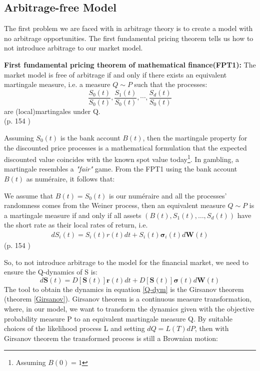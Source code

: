 \subsection{Arbitrage-free Model}
The first problem we are faced with in arbitrage theory is to create a model with no arbitrage opportunities. The first fundamental pricing theorem tells us how to not introduce arbitrage to our market model.
\begin{theorem}\label{FFT1}
\textbf{First fundamental pricing theorem of mathematical finance(FPT1): } The market model is free of arbitrage if and only if there exists an equivalent martingale measure, i.e. a measure $Q\sim P$ such that the processes:
$$\frac{S_0(t)}{S_0(t)}, \frac{S_1(t)}{S_0(t)}, \cdots, \frac{S_d(t)}{S_0(t)}$$
are (local)martingales under Q.
\\ \null \hfill (p. 154 \parencite{finKont})
\end{theorem}
Assuming $S_0(t)$ is the bank account $B(t)$, then the martingale property for the discounted price processes is a mathematical formulation that the expected discounted value coincides with the known spot value today\footnote{Assuming $B(0)=1$}. In gambling, a martingale resembles a \textsl{"fair"} game. From the FPT1 using the bank account $B(t)$ as numéraire, it follows that:
\theoremstyle{proposition}
\begin{proposition}{}
We assume that $B(t)=S_0(t)$ is our numéraire and all the processes' randomness comes from the Weiner process, then an equivalent measure $Q \sim P$ is a martingale measure if and only if all assets $(B(t), S_1(t), \ldots, S_d(t))$ have the short rate as their local rates of return, i.e.
\begin{align*}
dS_i(t)=S_i(t)r(t)dt+S_i(t)\bm{\sigma}_i(t)d\bm{W}(t)
\end{align*}
\null \hfill (p. 154 \parencite{finKont})
\end{proposition}
So, to not introduce arbitrage to the model for the financial market, we need to ensure the Q-dynamics of S is:
\begin{equation}\label{Q-dym}
d\bm{S}(t)=D[\bm{S}(t)]\bm{r}(t)dt+D[\bm{S}(t)]\bm{\sigma}(t)d\bm{W}(t)
\end{equation}
The tool to obtain the dynamics in equation \eqref{Q-dym} is the Girsanov theorem (theorem \ref{Girsanov}). Girsanov theorem is a continuous measure transformation, where, in our model, we want to transform the dynamics given with the objective probability measure P to an equivalent martingale measure Q. By suitable choices of the likelihood process L and setting $dQ=L(T)dP$, then with Girsanov theorem the transformed process is still a Brownian motion:
